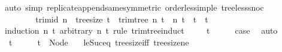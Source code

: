 \begin{isabellebody}
\ {\isacharparenleft}{\kern0pt}auto\ simp{\isacharcolon}{\kern0pt}\ replicate{\isacharunderscore}{\kern0pt}append{\isacharunderscore}{\kern0pt}same{\isacharbrackleft}{\kern0pt}symmetric{\isacharbrackright}{\kern0pt}\ order{\isacharunderscore}{\kern0pt}less{\isacharunderscore}{\kern0pt}imp{\isacharunderscore}{\kern0pt}le\ tree{\isacharunderscore}{\kern0pt}less{\isacharunderscore}{\kern0pt}snoc{}{\isacharparenright}{\kern0pt}\isanewline
\ \ \ \ \ \ \isamarkupfalse%
\isanewline
\ \ \ \ \isamarkupfalse%
\isanewline
\ \ \isamarkupfalse%
\isanewline
{}\isamarkupfalse%
%
\endisatagproof
{\isafoldproof}%
%
\isadelimproof
\isanewline
%
\endisadelimproof
\isanewline
{}\isamarkupfalse%
\ trim{\isacharunderscore}{\kern0pt}id{\isacharprime}{\kern0pt}{\isacharcolon}{\kern0pt}\ {\isachardoublequoteopen}n\ {\isasymge}\ tree{\isacharunderscore}{\kern0pt}size\ t\ {\isasymLongrightarrow}\ trim{\isacharunderscore}{\kern0pt}tree\ n\ t\ {\isacharequal}{\kern0pt}\ {\isacharparenleft}{\kern0pt}n{\isacharprime}{\kern0pt}{\isacharcomma}{\kern0pt}\ t{\isacharprime}{\kern0pt}{\isacharparenright}{\kern0pt}\ {\isasymLongrightarrow}\ t{\isacharprime}{\kern0pt}\ {\isacharequal}{\kern0pt}\ t{\isachardoublequoteclose}\isanewline
%
\isadelimproof
%
\endisadelimproof
%
\isatagproof
{}\isamarkupfalse%
\ {\isacharparenleft}{\kern0pt}induction\ n\ t\ arbitrary{\isacharcolon}{\kern0pt}\ n{\isacharprime}{\kern0pt}\ t{\isacharprime}{\kern0pt}\ rule{\isacharcolon}{\kern0pt}\ trim{\isacharunderscore}{\kern0pt}tree{\isachardot}{\kern0pt}induct{\isacharparenright}{\kern0pt}\isanewline
\ \ \isamarkupfalse%
\ {\isacharparenleft}{\kern0pt}{}\ t{\isacharparenright}{\kern0pt}\isanewline
\ \ \isamarkupfalse%
\ \isamarkupfalse%
\ {\isacharquery}{\kern0pt}case\ \isamarkupfalse%
\ auto\isanewline
{}\isamarkupfalse%
\isanewline
\ \ \isamarkupfalse%
\ {\isacharparenleft}{\kern0pt}{}\ t{\isacharparenright}{\kern0pt}\isanewline
\ \ \isamarkupfalse%
\ \isamarkupfalse%
\ {\isachardoublequoteopen}t\ {\isacharequal}{\kern0pt}\ Node\ {\isacharbrackleft}{\kern0pt}{\isacharbrackright}{\kern0pt}{\isachardoublequoteclose}\ \isamarkupfalse%
\ le{\isacharunderscore}{\kern0pt}Suc{\isacharunderscore}{\kern0pt}eq\ tree{\isacharunderscore}{\kern0pt}size{\isacharunderscore}{\kern0pt}{}{\isacharunderscore}{\kern0pt}iff\ tree{\isacharunderscore}{\kern0pt}size{\isacharunderscore}{\kern0pt}ne{\isacharunderscore}{\kern0pt}{}\ \isamarkupfalse%

\end{isabellebody}
